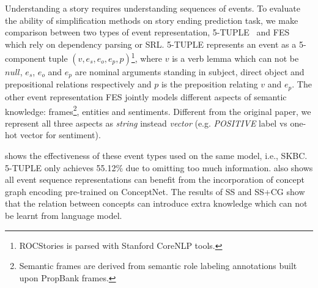 
Understanding a story requires understanding sequences of events. 
To evaluate the ability of 
simplification methods on story ending prediction task, we make comparison between
 two types of event representation, 5-TUPLE~\cite{pichotta2016learning} and FES~\cite{peng2017joint}
  which rely on dependency parsing or SRL. 
  5-TUPLE represents an event as a 5-component tuple $(v, e_s, e_o, e_p, p)
  $\footnote{ROCStories is parsed with Stanford CoreNLP tools.}, 
  where $v$ is a verb lemma which can not be $null$, $e_s$, $e_o$ and $e_p$ are nominal 
  arguments standing in subject, direct object and prepositional 
  relations respectively and $p$ is the preposition relating $v$ and $e_p$. 
The other event representation FES jointly models different aspects of 
semantic knowledge: frames\footnote{Semantic frames 
are derived from semantic role labeling annotations built upon PropBank frames. }, 
entities and sentiments. 
Different from the original paper, we represent all three aspects 
as \textit{string} instead \textit{vector} (e.g. \textit{POSITIVE} 
label vs one-hot vector for sentiment).

 shows the effectiveness of these event types
used on the same model, i.e., SKBC. 5-TUPLE only 
achieves 55.12\% due to omitting too much information. 
 also shows all event sequence representations can benefit from 
the incorporation of concept graph encoding pre-trained on ConceptNet. 
The results of SS and SS+CG show that the relation between concepts 
can introduce extra knowledge which can not be learnt from language model.

